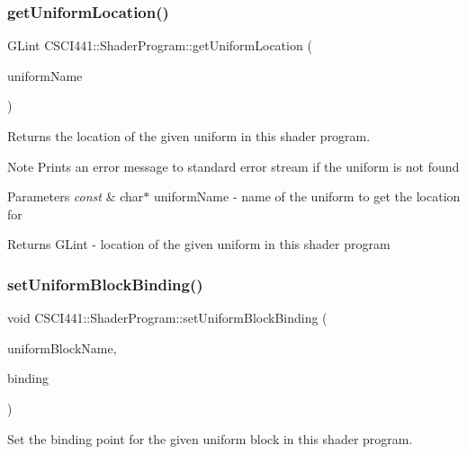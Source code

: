 \subsubsection{\texorpdfstring{get\+Uniform\+Location()}{getUniformLocation()}}
{\footnotesize\ttfamily G\+Lint C\+S\+C\+I441\+::\+Shader\+Program\+::get\+Uniform\+Location (\begin{DoxyParamCaption}\item[{const char $\ast$}]{uniform\+Name }\end{DoxyParamCaption})}



Returns the location of the given uniform in this shader program. 

\begin{DoxyNote}{Note}
Prints an error message to standard error stream if the uniform is not found 
\end{DoxyNote}

\begin{DoxyParams}{Parameters}
{\em const} & char$\ast$ uniform\+Name -\/ name of the uniform to get the location for \\
\hline
\end{DoxyParams}
\begin{DoxyReturn}{Returns}
G\+Lint -\/ location of the given uniform in this shader program 
\end{DoxyReturn}
\mbox{\label{class_c_s_c_i441_1_1_shader_program_ae1200c6f7a7afd36ed1090eb47a7d3ac}} 
\subsubsection{\texorpdfstring{set\+Uniform\+Block\+Binding()}{setUniformBlockBinding()}}
{\footnotesize\ttfamily void C\+S\+C\+I441\+::\+Shader\+Program\+::set\+Uniform\+Block\+Binding (\begin{DoxyParamCaption}\item[{const char $\ast$}]{uniform\+Block\+Name,  }\item[{G\+Luint}]{binding }\end{DoxyParamCaption})}



Set the binding point for the given uniform block in this shader program. 

